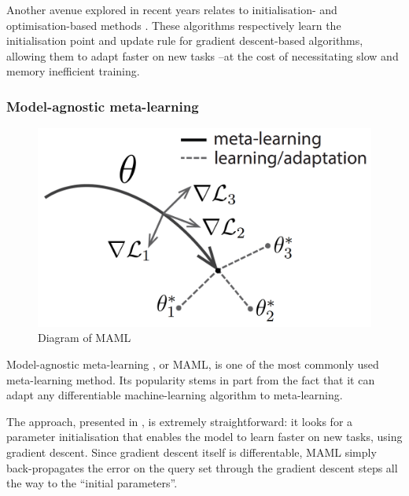 \documentclass[11pt]{article}
\numberwithin{equation}{subsection}
\begin{document}
Another avenue explored in recent years relates to initialisation- and optimisation-based methods \citep{finn2017model, kim2018bayesian, ravi2016optimization}.
These algorithms respectively learn the initialisation point and update rule for gradient descent-based algorithms, allowing them to adapt faster on new tasks –at the cost of necessitating slow and memory inefficient training.


\subsubsection{Model-agnostic meta-learning}
\label{sec:maml}

\begin{figure}
  \centering
  \vspace{-.3cm}
  \includegraphics[width=.95\linewidth]{scoring/maml}
  \caption{Diagram of MAML\\\citep{finn2017model}} %
  \label{fig:maml}
\end{figure}

Model-agnostic meta-learning \citep{finn2017model}, or MAML, is one of the most commonly used meta-learning method. Its popularity stems in part from the fact that it can adapt any differentiable machine-learning algorithm to meta-learning.

The approach, presented in , is extremely straightforward: it looks for a parameter initialisation that enables the model to learn faster on new tasks, using gradient descent. Since gradient descent itself is differentable, MAML simply back-propagates the error on the query set through the gradient descent steps all the way to the ``initial parameters''.
\end{document}
